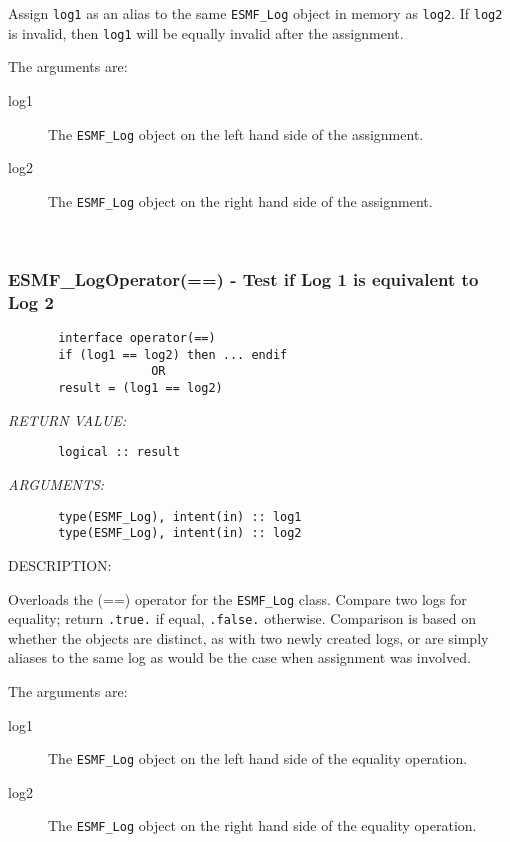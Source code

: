      Assign {\tt log1} as an alias to the same {\tt ESMF\_Log} object in memory
     as {\tt log2}. If {\tt log2} is invalid, then {\tt log1} will be
     equally invalid after the assignment.
  
     The arguments are:
     \begin{description}
     \item[log1]
       The {\tt ESMF\_Log} object on the left hand side of the assignment.
     \item[log2]
       The {\tt ESMF\_Log} object on the right hand side of the assignment.
     \end{description}
   
 
\mbox{}\hrulefill\ 
 
\subsubsection [ESMF\_LogOperator(==)] {ESMF\_LogOperator(==) - Test if Log 1 is equivalent to Log 2}


  
\begin{verbatim}       interface operator(==)
       if (log1 == log2) then ... endif
                    OR
       result = (log1 == log2)\end{verbatim}{\em RETURN VALUE:}
\begin{verbatim}       logical :: result\end{verbatim}{\em ARGUMENTS:}
\begin{verbatim}       type(ESMF_Log), intent(in) :: log1
       type(ESMF_Log), intent(in) :: log2\end{verbatim}
{\sf DESCRIPTION:\\ }


       Overloads the (==) operator for the {\tt ESMF\_Log} class.
       Compare two logs for equality; return {\tt .true.} if equal,
       {\tt .false.} otherwise. Comparison is based on whether the objects
       are distinct, as with two newly created logs, or are simply aliases
       to the same log as would be the case when assignment was involved.
  
       The arguments are:
       \begin{description}
       \item[log1]
            The {\tt ESMF\_Log} object on the left hand side of the equality
            operation.
       \item[log2]
            The {\tt ESMF\_Log} object on the right hand side of the equality
            operation.
       \end{description}
   
